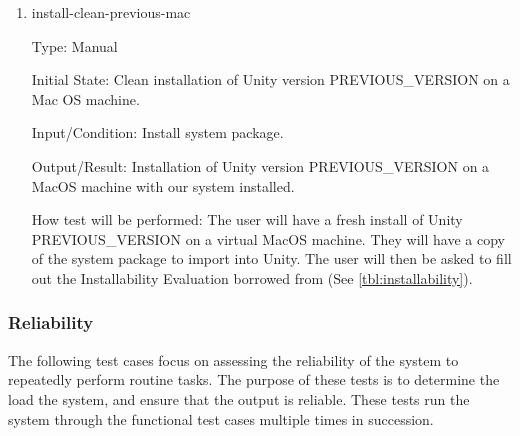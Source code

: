 \documentclass[12pt, titlepage]{article}
\begin{document}
\begin{enumerate}
\item{install-clean-previous-mac\\}

Type: Manual

Initial State: Clean installation of Unity version PREVIOUS\_VERSION on a Mac 
OS machine.

Input/Condition: Install system package.

Output/Result: Installation of Unity version PREVIOUS\_VERSION on a 
MacOS machine with our system installed.

How test will be performed: The user will have a fresh install of Unity 
PREVIOUS\_VERSION on a virtual MacOS machine. They will have a copy of the 
system package to import into Unity. The user will then be asked to fill out 
the Installability Evaluation borrowed from \cite{SmithEtAl2018} (See 
\ref{tbl:installability}).

\end{enumerate}

\subsubsection{Reliability}
The following test cases focus on assessing the reliability of the system to 
repeatedly perform routine tasks. The purpose of these tests is to determine 
the load the system, and ensure that the output is reliable. These tests run 
the system through the functional test cases multiple times in succession.
\end{document}

